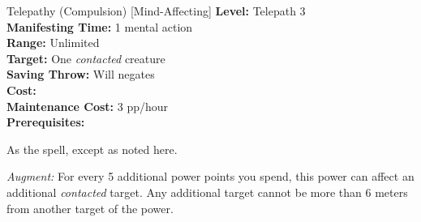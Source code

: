 {Telepathy (Compulsion) [Mind-Affecting]}
{
	\textbf{Level:}
	Telepath 3\\
	\textbf{Manifesting Time:}
	1 mental action\\
	\textbf{Range:}
	Unlimited\\
	\textbf{Target:}
	One \emph{contacted} creature\\
	\textbf{Saving Throw:}
	Will negates\\
	\textbf{Cost:}
	\\
	\textbf{Maintenance Cost:}
	3 pp/hour\\
	\textbf{Prerequisites:}
	\\
}
{
	As the  spell, except as noted here.

	\textit{Augment:} For every 5 additional power points you spend, this power can affect an additional \emph{contacted} target. Any additional target cannot be more than 6 meters from another target of the power.
}
